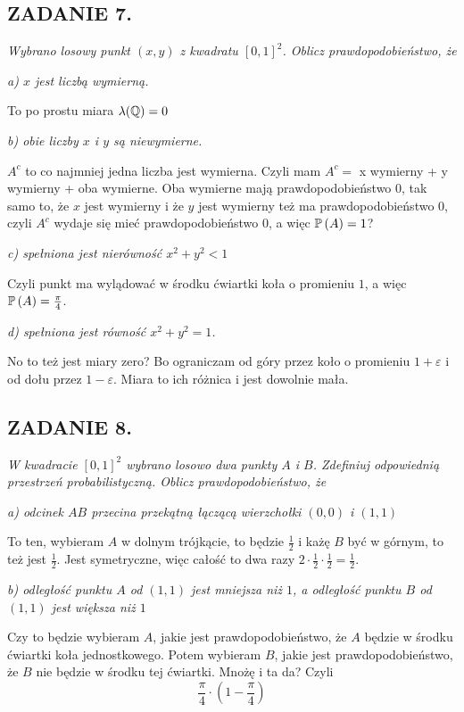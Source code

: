 \documentclass{article}
\begin{document}
\subsection*{ZADANIE 7.}
\emph{Wybrano losowy punkt $(x,y)$ z kwadratu $[0,1]^2$. Oblicz prawdopodobieństwo, że}

\indent \emph{\color{blue}a) $x$ jest liczbą wymierną.}
\smallskip

To po prostu miara $\lambda(\mathbb{Q})=0$
\smallskip

\indent \emph{\color{blue}b) obie liczby $x$ i $y$ są niewymierne.}
\smallskip

$A^c$ to co najmniej jedna liczba jest wymierna. Czyli mam $A^c=$ x wymierny + y wymierny + oba wymierne. Oba wymierne mają prawdopodobieństwo 0, tak samo to, że $x$ jest wymierny i że $y$ jest wymierny też ma prawdopodobieństwo $0$, czyli $A^c$ wydaje się mieć prawdopodobieństwo $0$, a więc $\mathbb{P}\left(A\right)=1$?
\smallskip

\indent \emph{\color{blue}c) spełniona jest nierówność $x^2+y^2<1$}
\smallskip

Czyli punkt ma wylądować w środku ćwiartki koła o promieniu $1$, a więc $\mathbb{P}\left(A\right)=\frac\pi4$.
\smallskip

\indent \emph{\color{blue}d) spełniona jest równość $x^2+y^2=1$.}
\smallskip

No to też jest miary zero? Bo ograniczam od góry przez koło o promieniu $1+\varepsilon$ i od dołu przez $1-\varepsilon$. Miara to ich różnica i jest dowolnie mała.

\subsection*{ZADANIE 8.}
\emph{W kwadracie $[0,1]^2$ wybrano losowo dwa punkty $A$ i $B$. Zdefiniuj odpowiednią przestrzeń probabilistyczną. Oblicz prawdopodobieństwo, że}

\indent \emph{\color{blue}a) odcinek $AB$ przecina przekątną łączącą wierzchołki $(0,0)$ i $(1,1)$}
\smallskip

To ten, wybieram $A$ w dolnym trójkącie, to będzie $\frac12$ i każę $B$ być w górnym, to też jest $\frac12$. Jest symetryczne, więc całość to dwa razy $2\cdot \frac12\cdot\frac12=\frac12$.

\indent \emph{\color{blue}b) odległość punktu $A$ od $(1, 1)$ jest mniejsza niż $1$, a odległość punktu $B$ od $(1, 1)$ jest większa niż $1$}
\smallskip

Czy to będzie wybieram $A$, jakie jest prawdopodobieństwo, że $A$ będzie w środku ćwiartki koła jednostkowego. Potem wybieram $B$, jakie jest prawdopodobieństwo, że $B$ nie będzie w środku tej ćwiartki. Mnożę i ta da? Czyli
$$\frac\pi4\cdot(1-\frac\pi4)$$
\end{document}

